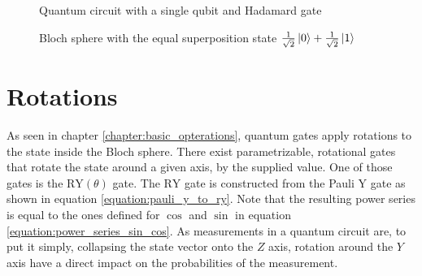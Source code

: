 \begin{figure}[!h]
    \centering
    \caption{Quantum circuit with a single qubit and Hadamard gate}
    \label{fig:circuit_hadamard}
\end{figure}

\begin{figure}[!h]
    \centering
    \caption{Bloch sphere with the equal superposition state $\frac{1}{\sqrt{2}}\ket{0} + \frac{1}{\sqrt{2}}\ket{1}$}
    \label{fig:circuit_hadamard_bloch_sphere}
\end{figure}

\clearpage

\section{Rotations}
\label{chapter:rotations}

As seen in chapter \ref{chapter:basic_opterations}, quantum gates apply rotations to the state inside the Bloch sphere. There exist parametrizable, rotational gates that rotate the state around a given axis, by the supplied value. One of those gates is the $\mathrm{RY}(\theta)$\cite{qiskit_rygate_nodate} gate. The $\mathrm{RY}$ gate is constructed from the Pauli $\mathrm{Y}$ gate as shown in equation \ref{equation:pauli_y_to_ry}. Note that the resulting power series is equal to the ones defined for $\cos$ and $\sin$ in equation \ref{equation:power_series_sin_cos}\cite{lars_complex_1978}. As measurements in a quantum circuit are, to put it simply, collapsing the state vector onto the $Z$ axis\cite{feynman_feynman_1965}, rotation around the $Y$ axis have a direct impact on the probabilities of the measurement.

